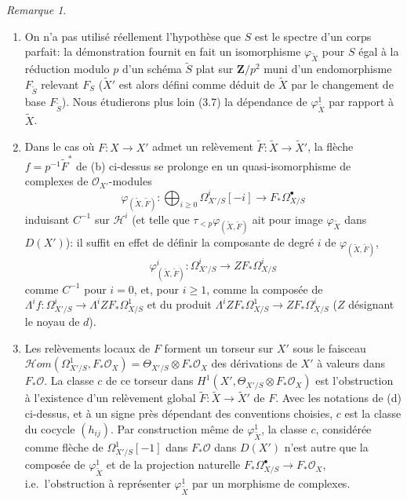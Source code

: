 \documentclass[12pt,a4paper]{article}
\theoremstyle{plain}
\theoremstyle{definition}
\theoremstyle{remark}
\newtheorem{remark}[theorem]{Remarque}
\newcommand{\cO}{\mathcal{O}}
\begin{document}
\begin{remark}\label{rem:2.2}
\begin{enumerate}[label=(\roman*)]
\item On n'a pas utilis\'e r\'eellement l'hypoth\`ese que $S$ est le spectre d'un corps parfait: la d\'emonstration fournit en fait un isomorphisme $\varphi_{\tilde{X}}$ pour $S$ \'egal \`a la r\'eduction modulo $p$ d'un sch\'ema $\tilde{S}$ plat sur $\mathbf{Z}/p^2$ muni d'un endomorphisme $F_{\tilde{S}}$ relevant $F_S$ ($\tilde{X}'$ est alors d\'efini comme d\'eduit de $\tilde{X}$ par le changement de base $F_{\tilde{S}}$). Nous \'etudierons plus loin (3.7) la d\'ependance de $\varphi^1_{\tilde{X}}$ par rapport \`a $\tilde{X}$.

\item Dans le cas o\`u $F: X \to X'$ admet un rel\`evement $\tilde{F}: \tilde{X} \to \tilde{X}'$, la fl\`eche $f = p^{-1}\tilde{F}^*$ de (b) ci-dessus se prolonge en un quasi-isomorphisme de complexes de $\cO_{X'}$-modules
\[
\varphi_{(\tilde{X}, \tilde{F})}: \bigoplus_{i \ge 0} \Omega^i_{X'/S}[-i] \to F_* \Omega^{\bullet}_{X/S}
\]
induisant $C^{-1}$ sur $\mathscr{H}^i$ (et telle que $\tau_{<p} \varphi_{(\tilde{X}, \tilde{F})}$ ait pour image $\varphi_{\tilde{X}}$ dans $D(X')$): il suffit en effet de d\'efinir la composante de degr\'e $i$ de $\varphi_{(\tilde{X}, \tilde{F})}$,
\[
\varphi^i_{(\tilde{X}, \tilde{F})}: \Omega^i_{X'/S} \to Z F_* \Omega^i_{X/S}
\]
comme $C^{-1}$ pour $i = 0$, et, pour $i \ge 1$, comme la compos\'ee de $\Lambda^i f: \Omega^i_{X'/S} \to \Lambda^i Z F_* \Omega^1_{X/S}$ et du produit $\Lambda^i Z F_* \Omega^1_{X/S} \to Z F_* \Omega^i_{X/S}$ ($Z$ d\'esignant le noyau de $d$).

\item Les rel\`evements locaux de $F$ forment un torseur sur $X'$ sous le faisceau $\mathscr{H}om(\Omega^1_{X'/S}, F_* \cO_X) = \Theta_{X'/S} \otimes F_* \cO_X$ des d\'erivations de $X'$ \`a valeurs dans $F_* \cO$. La classe $c$ de ce torseur dans $H^1(X', \Theta_{X'/S} \otimes F_* \cO_X)$ est l'obstruction \`a l'existence d'un rel\`evement global $\tilde{F}: \tilde{X} \to \tilde{X}'$ de $F$. Avec les notations de (d) ci-dessus, et \`a un signe pr\`es d\'ependant des conventions choisies, $c$ est la classe du cocycle $(h_{ij})$. Par construction m\^eme de $\varphi^1_{\tilde{X}}$, la classe $c$, consid\'er\'ee comme fl\`eche de $\Omega^1_{X'/S}[-1]$ dans $F_* \cO$ dans $D(X')$ n'est autre que la compos\'ee de $\varphi^1_{\tilde{X}}$ et de la projection naturelle $F_* \Omega^{\bullet}_{X/S} \to F_* \cO_X$, i.e.~l'obstruction \`a repr\'esenter $\varphi^1_{\tilde{X}}$ par un morphisme de complexes.


\end{enumerate}
\end{remark}
\end{document}
